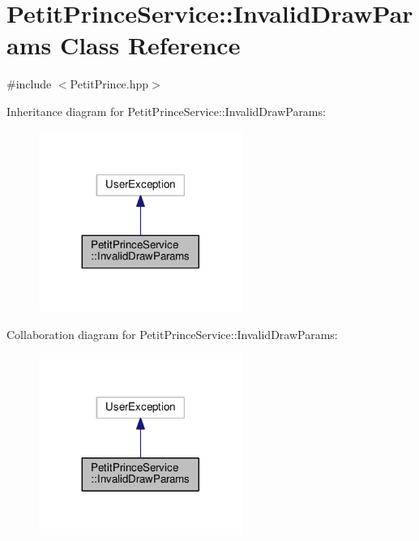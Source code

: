 \hypertarget{class_petit_prince_service_1_1_invalid_draw_params}{}\section{Petit\+Prince\+Service\+:\+:Invalid\+Draw\+Params Class Reference}
\label{class_petit_prince_service_1_1_invalid_draw_params}


{\ttfamily \#include $<$Petit\+Prince.\+hpp$>$}



Inheritance diagram for Petit\+Prince\+Service\+:\+:Invalid\+Draw\+Params\+:
\nopagebreak
\begin{figure}[H]
\begin{center}
\leavevmode
\includegraphics[width=188pt]{class_petit_prince_service_1_1_invalid_draw_params__inherit__graph}
\end{center}
\end{figure}


Collaboration diagram for Petit\+Prince\+Service\+:\+:Invalid\+Draw\+Params\+:
\nopagebreak
\begin{figure}[H]
\begin{center}
\leavevmode
\includegraphics[width=188pt]{class_petit_prince_service_1_1_invalid_draw_params__coll__graph}
\end{center}
\end{figure}
